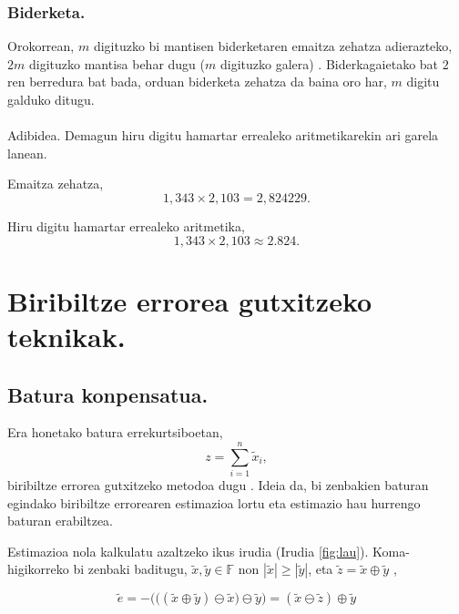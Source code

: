  
\subsubsection*{Biderketa.}

Orokorrean, $m$ digituzko bi mantisen biderketaren emaitza zehatza adierazteko, $2m$ digituzko mantisa behar dugu ($m$ digituzko galera) \cite{Fukushima2001}. Biderkagaietako bat $2$ren berredura bat bada, orduan biderketa zehatza da baina oro har, $m$ digitu galduko ditugu.  

\paragraph*{} Adibidea. Demagun hiru digitu hamartar errealeko aritmetikarekin ari garela lanean.

Emaitza zehatza, 
\begin{equation*}
1,343 \times 2,103 = 2,824229. 
\end{equation*} 

Hiru digitu hamartar errealeko aritmetika,
\begin{equation*}
1,343 \times 2,103 \approx 2.824.
\end{equation*}    

\section{Biribiltze errorea gutxitzeko teknikak.}
\subsection*{Batura konpensatua.}
   
Era honetako batura errekurtsiboetan,
\begin{equation*}
z=\sum\limits_{i=1}^{n} \tilde x_i,
\end{equation*}
biribiltze errorea gutxitzeko metodoa dugu \cite{Higham2002}.
Ideia da, bi zenbakien baturan egindako biribiltze errorearen estimazioa lortu eta estimazio hau hurrengo baturan erabiltzea.

Estimazioa nola kalkulatu azaltzeko ikus irudia (Irudia \ref{fig:lau}). Koma-higikorreko bi zenbaki baditugu, $\tilde x,\tilde y \in \mathbb{F}$ non $|\tilde x| \geq |\tilde y|$, eta $\tilde z= \tilde x \oplus \tilde y$ ,

\begin{equation*}
\tilde e= - \bigg(\big(( \tilde x \oplus \tilde y) \ominus \tilde x\big) \ominus \tilde y\bigg) = (\tilde x \ominus \tilde z) \oplus \tilde y
\end{equation*}  

